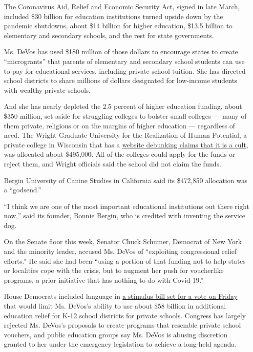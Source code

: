 \href{https://www.nytimes.com/2020/03/27/us/politics/coronavirus-house-voting.html}{The
Coronavirus Aid, Relief and Economic Security Act}, signed in late
March, included \$30 billion for education institutions turned upside
down by the pandemic shutdowns, about \$14 billion for higher education,
\$13.5 billion to elementary and secondary schools, and the rest for
state governments.

Ms. DeVos has used \$180 million of those dollars to encourage states to
create ``microgrants'' that parents of elementary and secondary school
students can use to pay for educational services, including private
school tuition. She has directed school districts to share millions of
dollars designated for low-income students with wealthy private schools.

And she has nearly depleted the 2.5 percent of higher education funding,
about \$350 million, set aside for struggling colleges to bolster small
colleges --- many of them private, religious or on the margins of higher
education --- regardless of need. The Wright Graduate University for the
Realization of Human Potential, a private college in Wisconsin that has
a \href{http://www.wrightinstitutecult.com}{website debunking claims
that it is a cult}, was allocated about \$495,000. All of the colleges
could apply for the funds or reject them, and Wright officials said the
school did not claim the funds.

Bergin University of Canine Studies in California said its \$472,850
allocation was a ``godsend.''

``I think we are one of the most important educational institutions out
there right now,'' said its founder, Bonnie Bergin, who is credited with
inventing the service dog.

On the Senate floor this week, Senator Chuck Schumer, Democrat of New
York and the minority leader, accused Ms. DeVos of ``exploiting
congressional relief efforts.'' He said she had been ``using a portion
of that funding not to help states or localities cope with the crisis,
but to augment her push for voucherlike programs, a prior initiative
that has nothing to do with Covid-19.''

House Democrats included language in
\href{https://docs.house.gov/billsthisweek/20200511/BILLS-116hr6800ih.pdf}{a
stimulus bill set for a vote on Friday} that would limit Ms. DeVos's
ability to use about \$58 billion in additional education relief for
K-12 school districts for private schools. Congress has largely rejected
Ms. DeVos's proposals to create programs that resemble private school
vouchers, and public education groups say Ms. DeVos is abusing
discretion granted to her under the emergency legislation to achieve a
long-held agenda.

